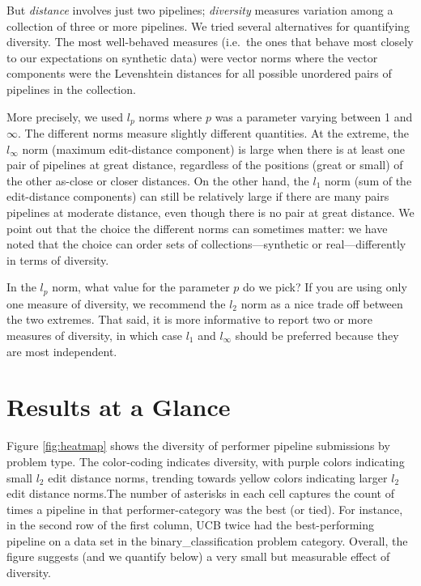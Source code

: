 \documentclass{article}
\begin{document}
But \emph{distance} involves just two pipelines; \emph{diversity}
measures variation among a collection of three or more pipelines.  We
tried several alternatives for quantifying diversity.  The most
well-behaved measures (i.e.\ the ones that behave most closely to our
expectations on synthetic data) were vector norms where the vector
components were the Levenshtein distances for all possible unordered
pairs of pipelines in the collection.

More precisely, we used $l_p$ norms where $p$ was a parameter varying
between 1 and $\infty$.  The different norms measure slightly different
quantities.  At the extreme, the $l_\infty$ norm (maximum
edit-distance component) is large when there is at least one pair of
pipelines at great distance, regardless of the positions (great or
small) of the other as-close or closer distances.  On the other hand,
the $l_1$ norm (sum of the edit-distance components) can still be
relatively large if there are many pairs pipelines at moderate
distance, even though there is no pair at great distance.  We point
out that the choice the different norms can sometimes matter: we have
noted that the choice can order sets of collections---synthetic or
real---differently in terms of diversity.


In the $l_p$ norm, what value for the parameter $p$ do we pick?  If
you are using only one measure of diversity, we recommend the $l_2$
norm as a nice trade off between the two extremes.  That said, it is
more informative to report two or more measures of diversity, in which
case $l_1$ and $l_\infty$ should be preferred because they are most
independent.

\section{Results at a Glance}
\label{sec:glance}
Figure \ref{fig:heatmap} shows the diversity of performer pipeline
submissions by problem type. The color-coding indicates diversity,
with purple colors indicating small $l_2$ edit distance norms,
trending towards yellow colors indicating larger $l_2$ edit distance
norms.The number of asterisks in each cell captures the count of times
a pipeline in that performer-category was the best (or tied). For
instance, in the second row of the first column, UCB twice had the
best-performing pipeline on a data set in the binary\_classification
problem category. Overall, the figure suggests (and we quantify below)
a very small but measurable effect of diversity.
\end{document}
